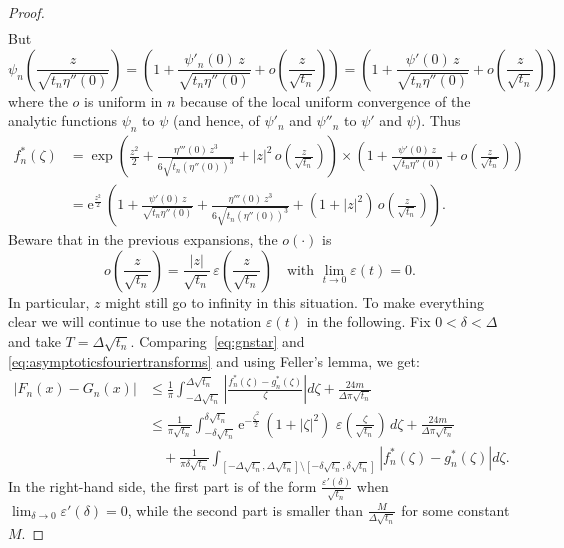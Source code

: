 \documentclass[12pt,a4paper,reqno]{amsart}
\theoremstyle{remark}
\newcommand{\E}{\mathrm{e}}
\newcommand{\eps}{\varepsilon}
\begin{document}
\begin{proof}
\begin{align*}
\end{align*}
But
\[ \psi_{n}\!\left(\frac{z}{\sqrt{t_{n}\eta''(0)}}\right) = \left(1+\frac{\psi'_n(0)\,z}{\sqrt{t_{n}\eta''(0)}}+o\!\left(\frac{z}{\sqrt{t_{n}}}\right)\right) = \left(1+\frac{\psi'(0)\,z}{\sqrt{t_{n}\eta''(0)}}+o\!\left(\frac{z}{\sqrt{t_{n}}}\right)\right)\]
where the $o$ is uniform in $n$ because of the local uniform convergence of the analytic functions $\psi_n$ to $\psi$ (and hence, of $\psi'_n$ and $\psi''_n$ to $\psi'$ and $\psi$). Thus
\begin{align}
    f_{n}^{*}(\zeta)&=\exp\left(\frac{z^{2}}{2}+\frac{\eta'''(0)\,z^{3}}{6\sqrt{t_{n}(\eta''(0))^{3}}}+|z|^{2}\,o\!\left(\frac{z}{\sqrt{t_{n}}}\right)\right)\times \left(1+\frac{\psi'(0)\,z}{\sqrt{t_{n}\eta''(0)}}+o\!\left(\frac{z}{\sqrt{t_{n}}}\right)\right)\nonumber\\
&=\E^{\frac{z^{2}}{2}}\,\left(1+\frac{\psi'(0)\,z}{\sqrt{t_{n}\eta''(0)}}+\frac{\eta'''(0)\,z^{3}}{6\sqrt{t_{n}(\eta''(0))^{3}}}+(1+|z|^{2})\,o\!\left(\frac{z}{\sqrt{t_{n}}}\right)\right).\label{eq:asymptoticsfouriertransforms}
\end{align}
Beware that in the previous expansions, the $o(\cdot)$ is 
$$o\!\left(\frac{z}{\sqrt{t_{n}}}\right)=\frac{|z|}{\sqrt{t_{n}}}\,\eps\!\left(\frac{z}{\sqrt{t_{n}}}\right)\quad \text{with } \lim_{t \to 0}\eps(t)=0.$$ 
In particular, $z$ might still go to infinity in this situation. To make everything clear we will continue to use the notation $\eps(t)$ in the following. Fix $0<\delta<\Delta$ and take $T=\Delta\sqrt{t_{n}}$.  Comparing~\eqref{eq:gnstar} and \eqref{eq:asymptoticsfouriertransforms} and using Feller's lemma, we get:
\begin{align}
|F_{n}(x)-G_{n}(x)|&\leq\frac{1}{\pi}\int_{-\Delta\sqrt{t_{n}}}^{\Delta\sqrt{t_{n}}} \left|\frac{f_{n}^{*}(\zeta)-g_{n}^{*}(\zeta)}{\zeta}\right|d\zeta + \frac{24m}{\Delta\pi\sqrt{t_{n}}}\nonumber\\
&\leq \frac{1}{\pi\sqrt{t_{n}}}\int_{-\delta\sqrt{t_{n}}}^{\delta\sqrt{t_{n}}} \E^{-\frac{\zeta^{2}}{2}}\,(1+|\zeta|^{2})\,\, \eps\!\left(\frac{\zeta}{\sqrt{t_{n}}}\right)\,d\zeta+\frac{24m}{\Delta\pi\sqrt{t_{n}}}\nonumber\\
&\quad+\frac{1}{\pi\delta\sqrt{t_{n}}}\int_{[-\Delta\sqrt{t_{n}},\Delta\sqrt{t_{n}}]\setminus[-\delta\sqrt{t_{n}},\delta\sqrt{t_{n}}]}\left|f_{n}^{*}(\zeta)-g_{n}^{*}(\zeta)\right|d\zeta.
\label{ineq:FmoinsG}
\end{align}
In the right-hand side, the first part is of the form $\frac{\eps'(\delta)}{\sqrt{t_{n}}}$ when 
$\lim_{\delta \to 0} \eps'(\delta)=0$,
while the second part is smaller than $\frac{M}{\Delta\sqrt{t_{n}}}$ for some constant $M$.\bigskip


\end{proof}
\end{document}
